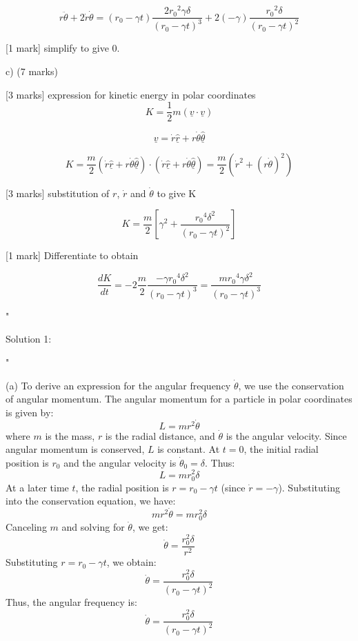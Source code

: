 \[ r \ddot{\theta} + 2\dot{r}\dot{\theta} = (r_0 - \gamma t) \frac{2{r_0}^2 \gamma \delta}{(r_0 - \gamma t)^3} + 2 (- \gamma) \frac{{r_0}^2 \delta}{(r_0 - \gamma t)^2}  \]

[1 mark] simplify to give 0. 

c) (7 marks)

[3 marks] expression for kinetic energy in polar coordinates 
\[ K = \frac{1}{2}m (\underline{v} \cdot \underline{v} ) \]

\[ \underline{v} = \dot{r} \underline{\hat{r}} + r \dot{\theta} \underline{\hat{\theta}} \]

\[ K = \frac{m}{2} \left ( \dot{r} \underline{\hat{r}} + r \dot{\theta} \underline{\hat{\theta}} \right ) \cdot \left ( \dot{r} \underline{\hat{r}} + r \dot{\theta} \underline{\hat{\theta}} \right ) = \frac{m}{2} \left ( \dot{r}^2 + (r \dot{\theta})^2 \right ) \]

[3 marks] substitution of \( r \), \( \dot{r} \) and \( \dot{\theta} \) to give K 

\[ K = \frac{m}{2} \left [ \gamma^2 + \frac{{r_0}^4 \delta^2}{(r_0 - \gamma t)^2} \right ] \]

[1 mark] Differentiate to obtain 

\[ \frac{dK}{dt} = -2 \frac{m}{2}\frac{-\gamma {r_0}^4 \delta^2}{(r_0 - \gamma t)^3} = \frac{m {r_0}^4 \gamma \delta^2}{(r_0 - \gamma t)^3} \]

"

Solution 1: 

"

(a) To derive an expression for the angular frequency \( \dot{\theta} \), we use the conservation of angular momentum. The angular momentum for a particle in polar coordinates is given by:
\[
L = m r^2 \dot{\theta}
\]
where \( m \) is the mass, \( r \) is the radial distance, and \( \dot{\theta} \) is the angular velocity. Since angular momentum is conserved, \( L \) is constant. At \( t = 0 \), the initial radial position is \( r_0 \) and the angular velocity is \( \dot{\theta}_0 = \delta \). Thus:
\[
L = m r_0^2 \delta
\]
At a later time \( t \), the radial position is \( r = r_0 - \gamma t \) (since \( \dot{r} = -\gamma \)). Substituting into the conservation equation, we have:
\[
m r^2 \dot{\theta} = m r_0^2 \delta
\]
Canceling \( m \) and solving for \( \dot{\theta} \), we get:
\[
\dot{\theta} = \frac{r_0^2 \delta}{r^2}
\]
Substituting \( r = r_0 - \gamma t \), we obtain:
\[
\dot{\theta} = \frac{r_0^2 \delta}{(r_0 - \gamma t)^2}
\]
Thus, the angular frequency is:
\[
\boxed{\dot{\theta} = \frac{r_0^2 \delta}{(r_0 - \gamma t)^2}}
\]

